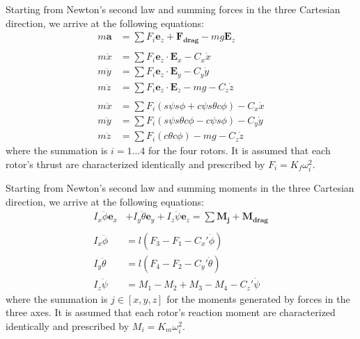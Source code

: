 \documentclass[conference]{IEEEtran}
\newcommand{\cphi}{c\phi}
\newcommand{\cth}{c\theta}
\newcommand{\cpsi}{c\psi}
\newcommand{\sphi}{s\phi}
\newcommand{\sth}{s\theta}
\newcommand{\spsi}{s\psi}
\newcommand{\E}{\mathbf{E}}
\newcommand{\e}{\mathbf{e}}
\begin{document}
Starting from Newton's second law and summing forces in the three Cartesian direction, we arrive at the following equations:
\begin{align*}
m\mathbf{a} &= \sum F_i \e_z + \mathbf{F_{drag}} - mg \E_z \\
\\
m\ddot{x} &= \sum F_i \e_z \cdot \E_x - C_x\dot{x} \\
m\ddot{y} &= \sum F_i \e_z \cdot \E_y - C_y\dot{y} \\
m\ddot{z} &= \sum F_i \e_z \cdot \E_z - mg - C_z\dot{z} \\
\\ 
m\ddot{x} &= \sum F_i (\spsi\sphi + \cpsi\sth\cphi) - C_x\dot{x} \\
m\ddot{y} &= \sum F_i (\spsi\sth\cphi - \cpsi\sphi) - C_y\dot{y} \\
m\ddot{z} &= \sum F_i (\cth\cphi) - mg - C_z\dot{z}
\end{align*}
where the summation is $i = 1 \dots 4$ for the four rotors. It is assumed that each rotor's thrust are characterized identically and prescribed by $F_i = K_f\omega_i^2$. 

Starting from Newton's second law and summing moments in the three Cartesian direction, we arrive at the following equations:
\begin{align*}
I_x\ddot{\phi} \e_x &+ I_y\ddot{\theta} \e_y + I_z\ddot{\psi} \e_z = \sum\mathbf{M_j} + \mathbf{M_{drag}}\\
\\
I_x\ddot{\phi} &= l(F_3 - F_1 - C_x' \dot{\phi}) \\
I_y\ddot{\theta} &= l(F_4 - F_2 - C_y' \dot{\theta}) \\
I_z\ddot{\psi} &= M_1 - M_2 + M_3 - M_4 - C_z'\dot{\psi}
\end{align*}
where the summation is $j \in [x,y,z]$ for the moments generated by forces in the three axes. It is assumed that each rotor's reaction moment are characterized identically and prescribed by $M_i = K_m\omega_i^2$. 
\end{document}
